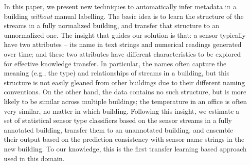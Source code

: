 In this paper, we present new techniques to automatically infer metadata in a building {\it without} manual labelling. 
The basic idea is to learn the structure of the streams in a fully normalized building, and transfer that structure to an unnormalized one. 
The insight that guides our solution is that: a sensor typically have two attributes -- its name in text strings and numerical readings generated over time; and these two attributes have different characteristics to be explored for effective knowledge transfer. 
In particular, the names often capture the meaning (e.g., the type) and relationships of streams in a building, but this structure is not easily gleaned from other buildings due to their different naming conventions.
On the other hand, the data contains no such structure, but is more likely to be similar across multiple buildings; the temperature in an office is often very similar, no matter in which building.
Following this insight, we estimate a set of statistical sensor type classifiers based on the sensor streams in a fully annotated building, transfer them to an unannotated building, and ensemble their output based on the prediction consistency with sensor name strings in the new building. 
To our knowledge, this is the first transfer learning based approach used in this domain.

